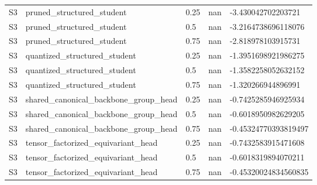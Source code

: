 \begin{table}[t]
\begin{tabular}{lllll}
S3 & pruned\_structured\_student & 0.25 & nan & -3.430042702203721 \\
S3 & pruned\_structured\_student & 0.5 & nan & -3.2164738696118076 \\
S3 & pruned\_structured\_student & 0.75 & nan & -2.818978103915731 \\
S3 & quantized\_structured\_student & 0.25 & nan & -1.3951698921986275 \\
S3 & quantized\_structured\_student & 0.5 & nan & -1.3582258052632152 \\
S3 & quantized\_structured\_student & 0.75 & nan & -1.320266944896991 \\
S3 & shared\_canonical\_backbone\_group\_head & 0.25 & nan & -0.7425285946925934 \\
S3 & shared\_canonical\_backbone\_group\_head & 0.5 & nan & -0.6018950982629205 \\
S3 & shared\_canonical\_backbone\_group\_head & 0.75 & nan & -0.45324770393819497 \\
S3 & tensor\_factorized\_equivariant\_head & 0.25 & nan & -0.7432583915471608 \\
S3 & tensor\_factorized\_equivariant\_head & 0.5 & nan & -0.6018319894070211 \\
S3 & tensor\_factorized\_equivariant\_head & 0.75 & nan & -0.45320024834560835 \\
\bottomrule
\end{tabular}
\end{table}
